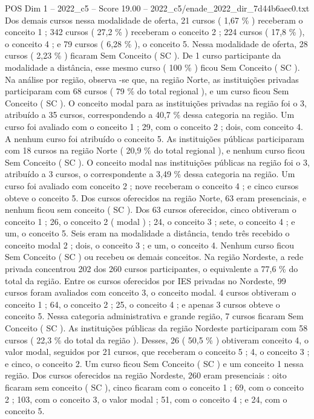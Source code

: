 \begin{textsample}{POS Dim 1 – 2022\_c5 – Score 19.00 – 2022\_c5/enade\_2022\_dir\_7d44b6aec0.txt}
Dos demais cursos nessa modalidade de oferta, 21 cursos ( 1,67 \% ) receberam o conceito 1 ; 342 cursos ( 27,2 \% ) receberam o conceito 2 ; 224 cursos ( 17,8 \% ), o conceito 4 ; e 79 cursos ( 6,28 \% ), o conceito 5.
Nessa modalidade de oferta, 28 cursos ( 2,23 \% ) ficaram Sem Conceito ( SC ).
De 1 curso participante da modalidade a distância, esse mesmo curso ( 100 \% ) ficou Sem Conceito ( SC ).
Na análise por região, observa -se que, na região Norte, as instituições privadas participaram com 68 cursos ( 79 \% do total regional ), e um curso ficou Sem Conceito ( SC ).
O conceito modal para as instituições privadas na região foi o 3, atribuído a 35 cursos, correspondendo a 40,7 \% dessa categoria na região.
Um curso foi avaliado com o conceito 1 ; 29, com o conceito 2 ; dois, com conceito 4.
A nenhum curso foi atribuído o conceito 5.
As instituições públicas participaram com 18 cursos na região Norte ( 20,9 \% do total regional ), e nenhum curso ficou Sem Conceito ( SC ).
O conceito modal nas instituições públicas na região foi o 3, atribuído a 3 cursos, o correspondente a 3,49 \% dessa categoria na região.
Um curso foi avaliado com conceito 2 ; nove receberam o conceito 4 ; e cinco cursos obteve o conceito 5.
Dos cursos oferecidos na região Norte, 63 eram presenciais, e nenhum ficou sem conceito ( SC ).
Dos 63 cursos oferecidos, cinco obtiveram o conceito 1 ; 26, o conceito 2 ( modal ) ; 24, o conceito 3 ; sete, o conceito 4 ; e um, o conceito 5.
Seis eram na modalidade a distância, tendo três recebido o conceito modal 2 ; dois, o conceito 3 ; e um, o conceito 4.
Nenhum curso ficou Sem Conceito ( SC ) ou recebeu os demais conceitos.
Na região Nordeste, a rede privada concentrou 202 dos 260 cursos participantes, o equivalente a 77,6 \% do total da região.
Entre os cursos oferecidos por IES privadas no Nordeste, 99 cursos foram avaliados com conceito 3, o conceito modal. 4 cursos obtiveram o conceito 1 ; 64, o conceito 2 ; 25, o conceito 4 ; e apenas 3 cursos obteve o conceito 5.
Nessa categoria administrativa e grande região, 7 cursos ficaram Sem Conceito ( SC ).
As instituições públicas da região Nordeste participaram com 58 cursos ( 22,3 \% do total da região ).
Desses, 26 ( 50,5 \% ) obtiveram conceito 4, o valor modal, seguidos por 21 cursos, que receberam o conceito 5 ; 4, o conceito 3 ; e cinco, o conceito 2.
Um curso ficou Sem Conceito ( SC ) e um conceito 1 nessa região.
Dos cursos oferecidos na região Nordeste, 260 eram presenciais : oito ficaram sem conceito ( SC ), cinco ficaram com o conceito 1 ; 69, com o conceito 2 ; 103, com o conceito 3, o valor modal ; 51, com o conceito 4 ; e 24, com o conceito 5.

\end{textsample}
